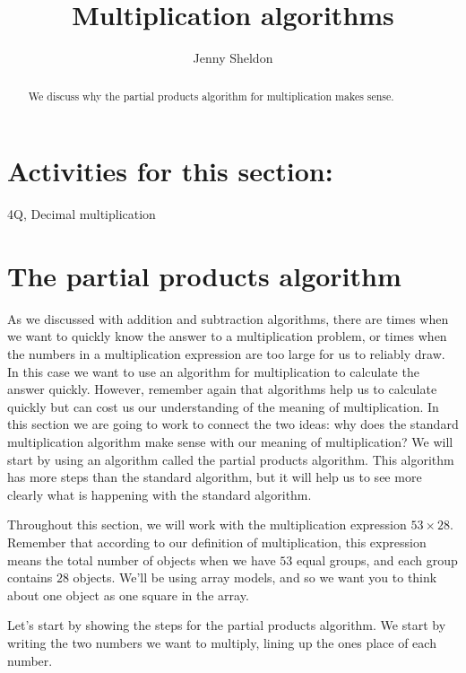 \documentclass{ximera}
\title{Multiplication algorithms}
\author{Jenny Sheldon}
\begin{document}
\begin{abstract}
We discuss why the partial products algorithm for multiplication makes sense.
\end{abstract}
\maketitle

\section{Activities for this section:} 4Q, Decimal multiplication

\section{The partial products algorithm}

As we discussed with addition and subtraction algorithms, there are times when we want to quickly know the answer to a multiplication problem, or times when the numbers in a multiplication expression are too large for us to reliably draw. In this case we want to use an algorithm for multiplication to calculate the answer quickly. However, remember again that algorithms help us to calculate quickly but can cost us our understanding of the meaning of multiplication. In this section we are going to work to connect the two ideas: why does the standard multiplication algorithm make sense with our meaning of multiplication? We will start by using an algorithm called the partial products algorithm. This algorithm has more steps than the standard algorithm, but it will help us to see more clearly what is happening with the standard algorithm.

Throughout this section, we will work with the multiplication expression $53 \times 28$. Remember that according to our definition of multiplication, this expression means the total number of objects when we have $53$ equal groups, and each group contains $28$ objects. We'll be using array models, and so we want you to think about one object as one square in the array.

Let's start by showing the steps for the partial products algorithm. We start by writing the two numbers we want to multiply, lining up the ones place of each number.

\begin{image}
\end{image}
\end{document}
